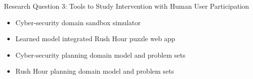 \begin{frame}{Research Question 3: Tools to Study Intervention with Human User Participation}
\begin{itemize}
\item Cyber-security domain sandbox simulator
\item Learned model integrated Rush Hour puzzle web app
\item Cyber-security planning domain model and problem sets
\item Rush Hour planning domain model and problem sets
\end{itemize}

\end{frame}